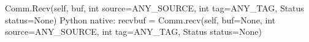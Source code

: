 Comm.Recv(self, buf, int source=ANY_SOURCE, int tag=ANY_TAG,
    Status status=None)
Python native:
recvbuf = Comm.recv(self, buf=None, int source=ANY_SOURCE, int tag=ANY_TAG,
    Status status=None)
